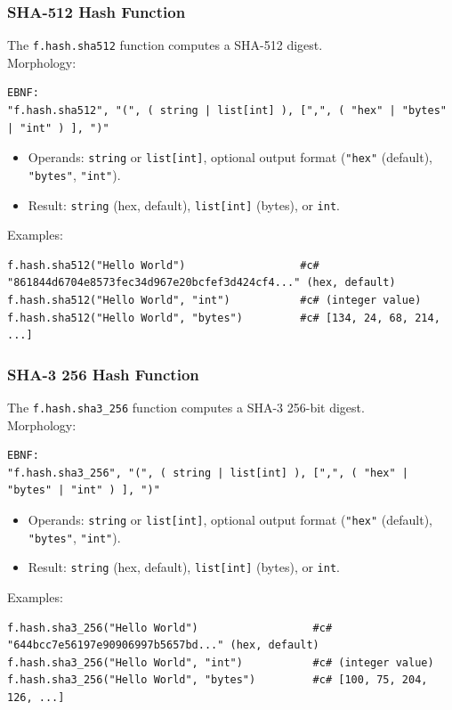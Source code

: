 \subsubsection{SHA-512 Hash Function}
The \texttt{f.hash.sha512} function computes a SHA-512 digest. \\
Morphology:
\begin{verbatim}
EBNF:
"f.hash.sha512", "(", ( string | list[int] ), [",", ( "hex" | "bytes" | "int" ) ], ")"
\end{verbatim}
\begin{itemize}
\item Operands: \texttt{string} or \texttt{list[int]}, optional output format (\texttt{"hex"} (default), \texttt{"bytes"}, \texttt{"int"}).
\item Result: \texttt{string} (hex, default), \texttt{list[int]} (bytes), or \texttt{int}.
\end{itemize}
Examples:
\begin{verbatim}
f.hash.sha512("Hello World")                  #c# "861844d6704e8573fec34d967e20bcfef3d424cf4..." (hex, default)
f.hash.sha512("Hello World", "int")           #c# (integer value)
f.hash.sha512("Hello World", "bytes")         #c# [134, 24, 68, 214, ...]
\end{verbatim}

\subsubsection{SHA-3 256 Hash Function}
The \texttt{f.hash.sha3\_256} function computes a SHA-3 256-bit digest. \\
Morphology:
\begin{verbatim}
EBNF:
"f.hash.sha3_256", "(", ( string | list[int] ), [",", ( "hex" | "bytes" | "int" ) ], ")"
\end{verbatim}
\begin{itemize}
\item Operands: \texttt{string} or \texttt{list[int]}, optional output format (\texttt{"hex"} (default), \texttt{"bytes"}, \texttt{"int"}).
\item Result: \texttt{string} (hex, default), \texttt{list[int]} (bytes), or \texttt{int}.
\end{itemize}
Examples:
\begin{verbatim}
f.hash.sha3_256("Hello World")                  #c# "644bcc7e56197e90906997b5657bd..." (hex, default)
f.hash.sha3_256("Hello World", "int")           #c# (integer value)
f.hash.sha3_256("Hello World", "bytes")         #c# [100, 75, 204, 126, ...]
\end{verbatim}

